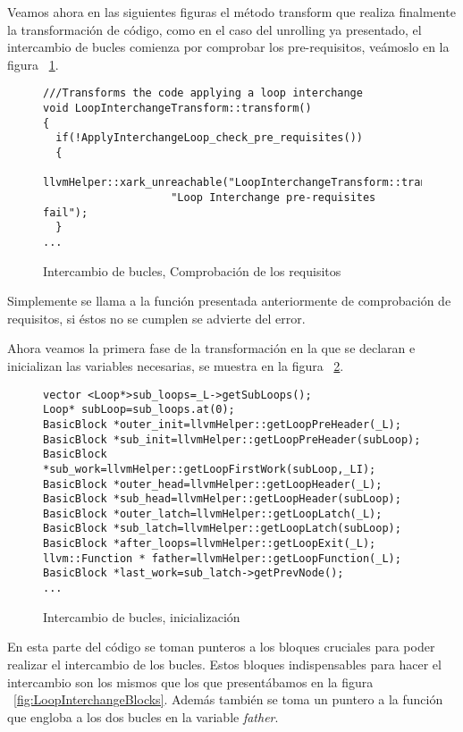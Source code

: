 Veamos ahora en las siguientes figuras el método transform que realiza finalmente la transformación de código, como en el caso del unrolling ya presentado, el intercambio de bucles comienza por comprobar los pre-requisitos, veámoslo en la figura ~\ref{FIG:LoopInterchangeTransformCheck}.

\begin{figure}[t]
\begin{lstlisting}
///Transforms the code applying a loop interchange
void LoopInterchangeTransform::transform()
{
  if(!ApplyInterchangeLoop_check_pre_requisites())
  {
    llvmHelper::xark_unreachable("LoopInterchangeTransform::transform()"
					"Loop Interchange pre-requisites fail");
  }
...
\end{lstlisting}
\caption{Intercambio de bucles, Comprobación de los requisitos}
\label{FIG:LoopInterchangeTransformCheck}
\end{figure}

Simplemente se llama a la función presentada anteriormente de comprobación de requisitos, si éstos no se cumplen se advierte del error.

Ahora veamos la primera fase de la transformación en la que se declaran e inicializan las variables necesarias, se muestra en la figura ~\ref{FIG:LoopInterchangeInit}.

\begin{figure}[t]
\begin{lstlisting}
vector <Loop*>sub_loops=_L->getSubLoops();
Loop* subLoop=sub_loops.at(0);
BasicBlock *outer_init=llvmHelper::getLoopPreHeader(_L);
BasicBlock *sub_init=llvmHelper::getLoopPreHeader(subLoop);
BasicBlock *sub_work=llvmHelper::getLoopFirstWork(subLoop,_LI);
BasicBlock *outer_head=llvmHelper::getLoopHeader(_L);
BasicBlock *sub_head=llvmHelper::getLoopHeader(subLoop);
BasicBlock *outer_latch=llvmHelper::getLoopLatch(_L);
BasicBlock *sub_latch=llvmHelper::getLoopLatch(subLoop);
BasicBlock *after_loops=llvmHelper::getLoopExit(_L);
llvm::Function * father=llvmHelper::getLoopFunction(_L);
BasicBlock *last_work=sub_latch->getPrevNode();
...
\end{lstlisting}
\caption{Intercambio de bucles, inicialización}
\label{FIG:LoopInterchangeInit}
\end{figure}

En esta parte del código se toman punteros a los bloques cruciales para poder realizar el intercambio de los bucles. Estos bloques indispensables para hacer el intercambio son los mismos que los que presentábamos en la figura ~\ref{fig:LoopInterchangeBlocks}. Además también se toma un puntero a la función que engloba a los dos bucles en la variable \textit{father}.

